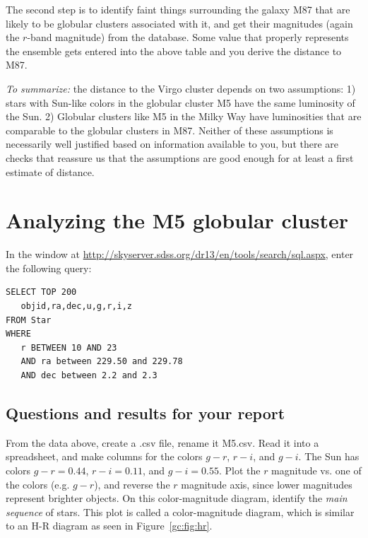 The second step is to identify faint things surrounding the galaxy M87 that are likely to be
globular clusters associated with it, and get their magnitudes (again the $r$-band magnitude)
from the database. Some value that properly represents the ensemble gets entered into the
above table and you derive the distance to M87.

\textit{To summarize:} the distance to the Virgo cluster depends on two assumptions: 1) stars
with Sun-like colors in the globular cluster M5 have the same luminosity of the Sun. 2)
Globular clusters like M5 in the Milky Way have luminosities that are comparable to
the globular clusters in M87. Neither of these assumptions is necessarily well justified based on information available to you, but there are checks that reassure us that the assumptions
are good enough for at least a first estimate of distance.

\section{Analyzing the M5 globular cluster}

In the window at \url{http://skyserver.sdss.org/dr13/en/tools/search/sql.aspx}, enter the following query:

\begin{verbatim}
SELECT TOP 200
   objid,ra,dec,u,g,r,i,z
FROM Star
WHERE
   r BETWEEN 10 AND 23
   AND ra between 229.50 and 229.78
   AND dec between 2.2 and 2.3
\end{verbatim}

\subsection{Questions and results for your report}

\begin{steps}
	\item From the data above, create a .csv file, rename it M5.csv. Read it into
	a spreadsheet, and make columns for the colors $g - r$, $r - i$, and $g - i$. The Sun has
	colors $g - r = 0.44$, $r - i = 0.11$, and $g - i = 0.55$. Plot the $r$ magnitude vs. one of the colors (e.g.
	$g - r$), and reverse the $r$ magnitude axis, since lower magnitudes represent brighter objects. On this color-magnitude diagram, identify
	the \textit{main sequence} of stars. This plot is called a color-magnitude diagram, which is similar to an H-R diagram as seen in Figure~\ref{gc:fig:hr}.
\end{steps}

